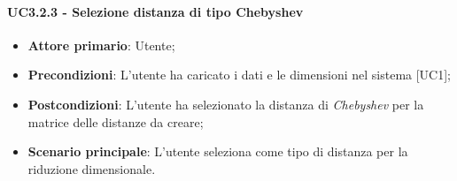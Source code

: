 \paragraph{UC3.2.3 - Selezione distanza di tipo Chebyshev}
\begin{itemize}
	\item \textbf{Attore primario}: Utente;
	\item \textbf{Precondizioni}: L'utente ha caricato i dati e le dimensioni nel sistema [UC1];
	\item \textbf{Postcondizioni}: L'utente ha selezionato la distanza di \textit{Chebyshev} per la matrice delle distanze da creare;
	\item \textbf{Scenario principale}: L'utente seleziona  come tipo di distanza per la riduzione dimensionale.
\end{itemize}